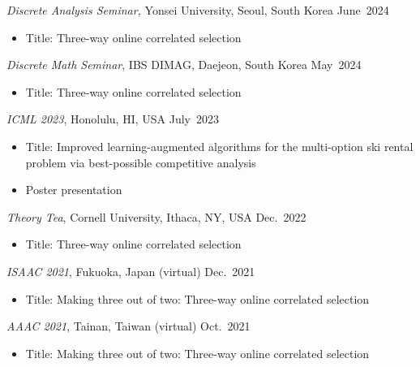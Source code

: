 \documentclass{article}
\newcommand{\killinitspace}{-0.7em}
\begin{document}
\textsl{Discrete Analysis Seminar,} Yonsei University, Seoul, South Korea \hfill June~2024
\vspace{\killinitspace}
\begin{itemize}
\item Title: Three-way online correlated selection
\end{itemize}

\textsl{Discrete Math Seminar}, IBS DIMAG, Daejeon, South Korea \hfill May~2024
\vspace{\killinitspace}
\begin{itemize}
\item Title: Three-way online correlated selection
\end{itemize}

\textsl{ICML 2023}, Honolulu, HI, USA \hfill July~2023
\vspace{\killinitspace}
\begin{itemize}
\item Title: Improved learning-augmented algorithms for the multi-option ski rental problem via best-possible competitive analysis
\item Poster presentation
\end{itemize}

\textsl{Theory Tea}, Cornell University, Ithaca, NY, USA \hfill Dec.~2022
\vspace{\killinitspace}
\begin{itemize}
\item Title: Three-way online correlated selection
\end{itemize}

\textsl{ISAAC 2021}, Fukuoka, Japan (virtual) \hfill Dec.~2021
\vspace{\killinitspace}
\begin{itemize}
\item Title: Making three out of two: Three-way online correlated selection
\end{itemize}

\textsl{AAAC 2021}, Tainan, Taiwan (virtual) \hfill Oct.~2021
\vspace{\killinitspace}
\begin{itemize}
\item Title: Making three out of two: Three-way online correlated selection
\end{itemize}
\end{document}
